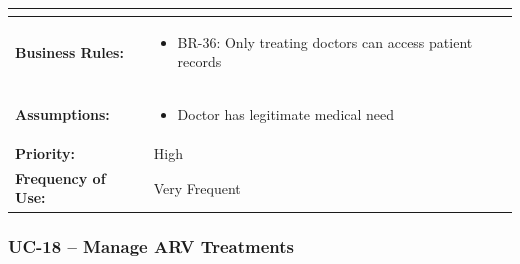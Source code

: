 \documentclass[12pt,a4paper]{article}
\begin{document}
\begin{longtable}{|p{4.5cm}|p{10.5cm}|}
\begin{itemize}
\end{itemize} \\
\hline
\textbf{Business Rules:} &
\begin{itemize}
  \item BR-36: Only treating doctors can access patient records
\end{itemize} \\
\hline
\textbf{Assumptions:} &
\begin{itemize}
  \item Doctor has legitimate medical need
\end{itemize} \\
\hline
\textbf{Priority:} & High \\
\hline
\textbf{Frequency of Use:} & Very Frequent \\
\hline
\end{longtable}

\subsubsection{UC-18 – Manage ARV Treatments}
\end{document}
